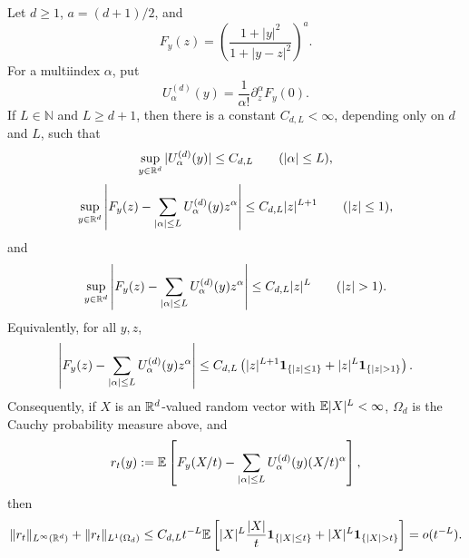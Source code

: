 \begin{lemma}%
\label{lem:global-multidim-quotient-remainder-core}
Let \(d\ge1\), \(a=(d+1)/2\), and
\[
F_y(z)=\left(\frac{1+|y|^2}{1+|y-z|^2}\right)^a .
\]
For a multiindex \(\alpha\), put
\[
U_\alpha^{(d)}(y)=\frac1{\alpha!}\partial_z^\alpha F_y(0).
\]
If \(L\in\mathbb N\) and \(L\ge d+1\), then there is a constant
\(C_{d,L}<\infty\), depending only on \(d\) and \(L\), such that
\begin{equation}\label{eq:multidim-coefficient-bound}
\sup_{y\in\mathbb{R}^d}|U_\alpha^{(d)}(y)|\le C_{d,L}
\qquad (|\alpha|\le L),
\end{equation}
\begin{equation}\label{eq:multidim-small-translation-remainder}
\sup_{y\in\mathbb{R}^d}\left|
F_y(z)-\sum_{|\alpha|\le L}U_\alpha^{(d)}(y)z^\alpha
\right|
\le C_{d,L}|z|^{L+1}
\qquad (|z|\le1),
\end{equation}
and
\begin{equation}\label{eq:multidim-large-translation-remainder}
\sup_{y\in\RR^d}\left|
F_y(z)-\sum_{|\alpha|\le L}U_\alpha^{(d)}(y)z^\alpha
\right|
\le C_{d,L}|z|^{L}
\qquad (|z|>1).
\end{equation}
Equivalently, for all \(y,z\),
\begin{equation}\label{eq:multidim-global-translation-remainder}
\left|
F_y(z)-\sum_{|\alpha|\le L}U_\alpha^{(d)}(y)z^\alpha
\right|
\le C_{d,L}\left(
|z|^{L+1}{\bf1}_{\{|z|\le1\}}
{}
+{}|z|^L{\bf1}_{\{|z|>1\}}
\right).
\end{equation}
Consequently, if \(X\) is an \(\mathbb{R}^d\)-valued random vector with
\(\mathbb{E}|X|^L<\infty\), \(\Omega_d\) is the Cauchy probability measure above,
and
\[
r_t(y):=\mathbb{E}\left[
F_y(X/t)-\sum_{|\alpha|\le L}U_\alpha^{(d)}(y)(X/t)^\alpha
\right],
\]
then
\begin{equation}\label{eq:multidim-integrated-remainder-bound}
\|r_t\|_{L^\infty(\RR^d)}+\|r_t\|_{L^1(\Omega_d)}
\le C_{d,L}t^{-L}\EE\left[
|X|^L\frac{|X|}{t}{\bf1}_{\{|X|\le t\}}
{}
+{}|X|^L{\bf1}_{\{|X|>t\}}
\right]=o(t^{-L}).
\end{equation}
\end{lemma}

